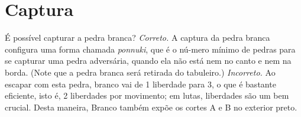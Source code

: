 \chapter{Captura}

\problemDiagrams
  {É possível capturar a pedra branca?}
\answerDiagrams
  {\emph{Correto.} A captura da pedra branca configura uma forma chamada \emph{ponnuki}, que é o nú-mero mínimo de pedras para se capturar uma pedra adversária, quando ela não está nem no canto e nem na borda. (Note que a pedra branca será retirada do tabuleiro.)}
  {\emph{Incorreto.} Ao escapar com esta pedra, branco vai de 1 liberdade para 3, o que é bastante eficiente, isto é, 2 liberdades por movimento; em lutas, liberdades são um bem crucial. Desta maneira, Branco também expõe os cortes A e B no exterior preto.}
